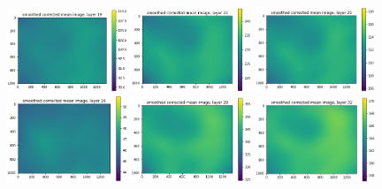 \documentclass[letterpaper,11pt]{article}
\begin{document}
\begin{figure}[!ht]
\includegraphics[width=0.32\textwidth]{images/results/smoothed_corrected_mean_image_layers_vectra/smoothed_corrected_mean_image_layer_19_same_scale}
\includegraphics[width=0.32\textwidth]{images/results/smoothed_corrected_mean_image_layers_vectra/smoothed_corrected_mean_image_layer_22_same_scale}
\includegraphics[width=0.32\textwidth]{images/results/smoothed_corrected_mean_image_layers_vectra/smoothed_corrected_mean_image_layer_25_same_scale}
\includegraphics[width=0.32\textwidth]{images/results/smoothed_corrected_mean_image_layers_vectra/smoothed_corrected_mean_image_layer_26_same_scale}
\includegraphics[width=0.32\textwidth]{images/results/smoothed_corrected_mean_image_layers_vectra/smoothed_corrected_mean_image_layer_29_same_scale}
\includegraphics[width=0.32\textwidth]{images/results/smoothed_corrected_mean_image_layers_vectra/smoothed_corrected_mean_image_layer_32_same_scale}

\end{figure}
\end{document}
